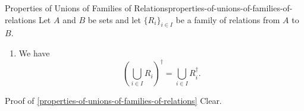 \begin{proposition}{Properties of Unions of Families of Relations}{properties-of-unions-of-families-of-relations}%
    Let $A$ and $B$ be sets and let $\{R_{i}\}_{i\in I}$ be a family of relations from $A$ to $B$.
    \begin{enumerate}
        \item\label{properties-of-unions-of-families-of-relations-interaction-with-converses}We have
            \[
                (\bigcup_{i\in I}R_{i})^{\dagger}
                =
                \bigcup_{i\in I}R^{\dagger}_{i}.
            \]%
    \end{enumerate}
\end{proposition}
\begin{Proof}{Proof of \cref{properties-of-unions-of-families-of-relations}}%
    Clear.
\end{Proof}
